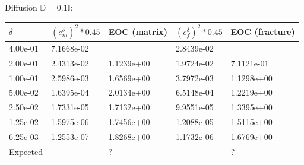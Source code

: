 \documentclass[a4paper]{article}
\def\tn#1{{\mathbb{#1}}}    %
\begin{document}
Diffusion $\tn D=0.1\tn I$:

\begin{tabular}{|l|ll|ll|}
\hline
$\delta$ & $(e_m^\delta)^2*0.45$ & EOC (matrix) & $(e_f^\delta)^2*0.45$ & EOC (fracture)\\
\hline
4.00e-01 & 7.1668e-02 &            & 2.8439e-02 &            \\
2.00e-01 & 2.4313e-02 & 1.1239e+00 & 1.9724e-02 & 7.1121e-01 \\
1.00e-01 & 2.5986e-03 & 1.6569e+00 & 3.7972e-03 & 1.1298e+00 \\
5.00e-02 & 1.6395e-04 & 2.0134e+00 & 6.5148e-04 & 1.2219e+00 \\
2.50e-02 & 1.7331e-05 & 1.7132e+00 & 9.9551e-05 & 1.3395e+00 \\
1.25e-02 & 1.5975e-06 & 1.7456e+00 & 1.2088e-05 & 1.5115e+00 \\
6.25e-03 & 1.2553e-07 & 1.8268e+00 & 1.1732e-06 & 1.6769e+00 \\
\hline
Expected & & ? & & ?\\
\hline
\end{tabular}


%





\end{document}

